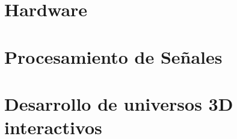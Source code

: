 \section{Hardware}

\section{Procesamiento de Señales}

\section{Desarrollo de universos 3D interactivos}